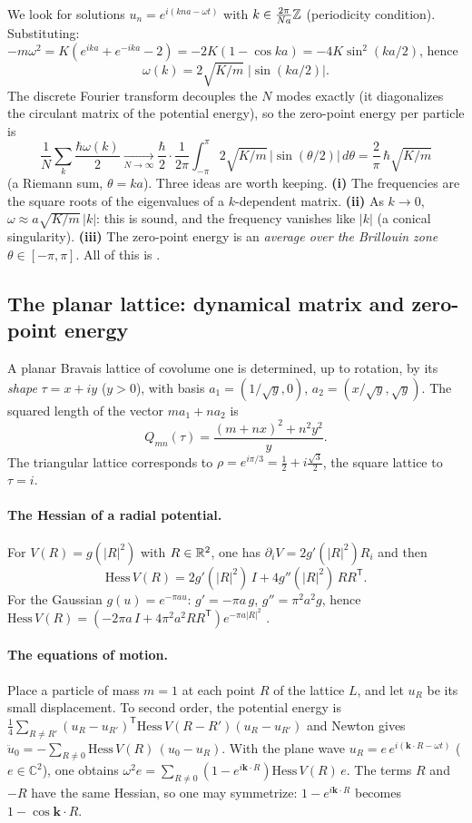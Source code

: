 We look for solutions $u_n=e^{i(kna-\omega t)}$ with $k\in\tfrac{2\pi}{Na}\mathbb{Z}$ (periodicity condition).
Substituting: $-m\omega^2=K(e^{ika}+e^{-ika}-2)=-2K(1-\cos ka)=-4K\sin^2(ka/2)$, hence
\[
\omega(k)=2\sqrt{K/m}\;\bigl|\sin(ka/2)\bigr| .
\]
The discrete Fourier transform decouples the $N$ modes exactly (it diagonalizes the circulant matrix of the potential
energy), so the zero-point energy per particle is
\[
\frac1N\sum_k\frac{\hbar\omega(k)}2\xrightarrow[N\to\infty]{}\frac{\hbar}{2}\cdot\frac1{2\pi}\int_{-\pi}^{\pi}2\sqrt{K/m}\,
|\sin(\theta/2)|\,d\theta=\frac{2}{\pi}\,\hbar\sqrt{K/m}
\]
(a Riemann sum, $\theta=ka$). Three ideas are worth keeping. \textbf{(i)} The frequencies are the square roots of the
eigenvalues of a $k$-dependent matrix. \textbf{(ii)} As $k\to0$, $\omega\approx a\sqrt{K/m}\,|k|$: this is sound, and
the frequency vanishes like $|k|$ (a conical singularity). \textbf{(iii)} The zero-point energy is an \emph{average over
the Brillouin zone} $\theta\in[-\pi,\pi]$. All of this is \tierC.

\subsection{The planar lattice: dynamical matrix and zero-point energy}\label{ch3:sec:matdyn}
A planar Bravais lattice of covolume one is determined, up to rotation, by its \emph{shape} $\tau=x+iy$ ($y>0$), with
basis $a_1=(1/\sqrt y,0)$, $a_2=(x/\sqrt y,\sqrt y)$. The squared length of the vector $ma_1+na_2$ is
\[
Q_{mn}(\tau)=\frac{(m+nx)^2+n^2y^2}{y}.
\]
The triangular lattice corresponds to $\rho=e^{i\pi/3}=\tfrac12+i\tfrac{\sqrt3}2$, the square lattice to $\tau=i$.

\paragraph{The Hessian of a radial potential.} For $V(R)=g(|R|^2)$ with $R\in\mathbb{R}^2$, one has
$\partial_iV=2g'(|R|^2)R_i$ and then
\begin{equation}\label{ch3:eq:hess}
\mathrm{Hess}\,V(R)=2g'(|R|^2)\,I+4g''(|R|^2)\,RR^{\mathsf T}.
\end{equation}
For the Gaussian $g(u)=e^{-\pi au}$: $g'=-\pi a\,g$, $g''=\pi^2a^2g$, hence
$\mathrm{Hess}\,V(R)=(-2\pi a\,I+4\pi^2a^2RR^{\mathsf T})e^{-\pi a|R|^2}$ \tierC.

\paragraph{The equations of motion.} Place a particle of mass $m=1$ at each point $R$ of the lattice $L$, and let
$u_R$ be its small displacement. To second order, the potential energy is
$\tfrac14\sum_{R\ne R'}(u_R-u_{R'})^{\mathsf T}\mathrm{Hess}\,V(R-R')(u_R-u_{R'})$ and Newton gives
$\ddot u_{0}=-\sum_{R\neq0}\mathrm{Hess}\,V(R)\,(u_0-u_R)$. With the plane wave $u_R=e\,e^{i(\mathbf k\cdot R-\omega t)}$
($e\in\mathbb{C}^2$), one obtains $\omega^2e=\sum_{R\ne0}(1-e^{i\mathbf k\cdot R})\mathrm{Hess}\,V(R)\,e$. The terms $R$
and $-R$ have the same Hessian, so one may symmetrize: $1-e^{i\mathbf k\cdot R}$ becomes $1-\cos\mathbf k\cdot R$.

